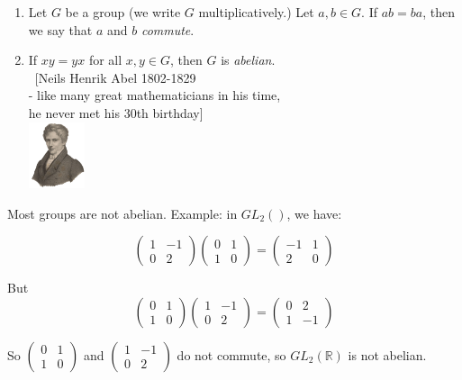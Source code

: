 \begin{definition}\begin{enumerate}
 \item Let $G$ be a group (we write $G$ multiplicatively.) Let $a,b \in G$. If $ab = ba$, then we say that $a$ and $b$ \emph{commute}. 
 \item 

 If $xy = yx$ for all $x,y \in G$, then $G$ is \emph{abelian}.\\ ~[Neils Henrik Abel 1802-1829\\ - like many great mathematicians in his time,\\ he never met his 30th birthday]  \\[-2cm] \vspace*{-50pt} \hspace*{260pt} \includegraphics[width=0.13\textwidth]{abel.jpg}
 \end{enumerate}
 \vspace*{50pt}
  \end{definition}

  Most groups are not abelian. Example: in $GL_2()$, we have:

\[\begin{pmatrix}
1 & -1 \\ 0 & 2
\end{pmatrix}
\begin{pmatrix}
0 & 1 \\ 1 & 0
\end{pmatrix}
= 
\begin{pmatrix}
-1 & 1\\ 2 & 0
\end{pmatrix}\]

But 
\[
\begin{pmatrix}
0 & 1 \\ 1 & 0
\end{pmatrix}
\begin{pmatrix}
1 & -1 \\ 0 & 2
\end{pmatrix}
=
\begin{pmatrix}
0 & 2 \\ 1 & -1
\end{pmatrix}\]

So $\left(\begin{smallmatrix}
0 & 1\\ 1 & 0
\end{smallmatrix}\right)
$ and $\left(\begin{smallmatrix}
1 & -1\\ 0 & 2
\end{smallmatrix}\right)
$ do not commute, so $GL_2(\mathbb{R})$ is not abelian.\\



